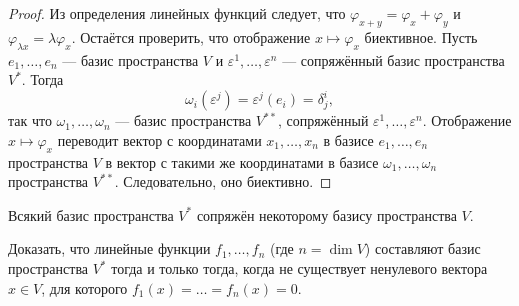\begin{proof}
    Из определения линейных функций следует, что $\varphi_{x + y} = \varphi_x + \varphi_y$ и $\varphi_{\lambda x} = \lambda\varphi_x$. Остаётся проверить, что отображение $x \mapsto \varphi_x$ биективное. Пусть $e_1, \ldots, e_n$ --- базис пространства $V$ и $\varepsilon^1, \ldots, \varepsilon^n$ --- сопряжённый базис пространства $V^\ast$. Тогда
    \[
        \omega_i(\varepsilon^j) = \varepsilon^j(e_i) = \delta^i_j,
    \]
    так что $\omega_1, \ldots, \omega_n$ --- базис пространства $V^{\ast\ast}$, сопряжённый $\varepsilon^1, \ldots, \varepsilon^n$. Отображение $x \mapsto \varphi_x$ переводит вектор с координатами $x_1, \ldots, x_n$ в базисе $e_1, \ldots, e_n$ пространства $V$ в вектор с такими же координатами в базисе $\omega_1, \ldots, \omega_n$ пространства $V^{\ast\ast}$. Следовательно, оно биективно.
\end{proof}

\begin{corollary}
    Всякий базис пространства $V^\ast$ сопряжён некоторому базису пространства $V$.
\end{corollary}

\begin{problem}[Из Винберга]
    Доказать, что линейные функции $f_1, \ldots, f_n$ (где $n = \dim V$) составляют базис пространства $V^\ast$ тогда и только тогда, когда не существует ненулевого вектора $x \in V$, для которого $f_1(x) = \ldots = f_n(x) = 0$.
\end{problem}

